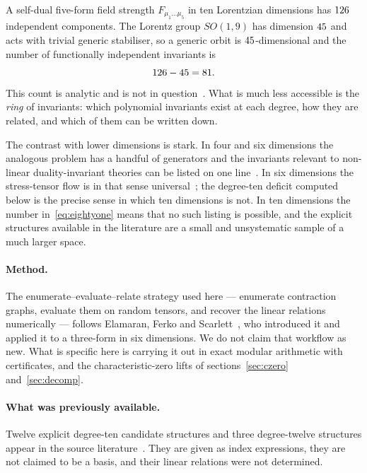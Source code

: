 \documentclass[11pt,a4paper]{article}
\begin{document}
A self-dual five-form field strength $F_{\mu_1\ldots\mu_5}$ in ten Lorentzian
dimensions has $126$ independent components. The Lorentz group
$SO(1,9)$ has dimension $45$ and acts with trivial generic
stabiliser, so a generic orbit is $45$-dimensional and the number
of functionally independent invariants is~\cite{Hutomo:2025chiral}
\begin{equation}
  126 - 45 = 81 .
  \label{eq:eightyone}
\end{equation}
This count is analytic and is not in question~\cite{Hutomo:2025chiral}. What is much less accessible is
the \emph{ring} of invariants: which polynomial invariants exist at each degree,
how they are related, and which of them can be written down.

The contrast with lower dimensions is stark. In four and six dimensions the
analogous problem has a handful of generators and the invariants relevant to
non-linear duality-invariant theories can be listed on one
line~\cite{Bandos:2020hgy,Townsend:2019ftg}. In six dimensions the
stress-tensor flow is in that sense
universal~\cite{Bandos:2024chiral,Brizio:2026ttbar}; the degree-ten deficit
computed below is the precise sense in which ten dimensions is not. In ten
dimensions the number in~\eqref{eq:eightyone} means that no such listing is
possible, and the explicit structures available in the literature are a small
and unsystematic sample of a much larger space.

\paragraph{Method.} The enumerate--evaluate--relate strategy used here ---
enumerate contraction graphs, evaluate them on random tensors, and recover the
linear relations numerically --- follows
Elamaran, Ferko and Scarlett~\cite{Elamaran:2025mlinv}, who introduced it and
applied it to a three-form in six dimensions. We do not claim that workflow as
new. What is specific here is carrying it out in exact modular arithmetic with
certificates, and the characteristic-zero lifts of
sections~\ref{sec:czero} and~\ref{sec:decomp}.

\paragraph{What was previously available.} Twelve explicit degree-ten
candidate structures and three degree-twelve structures appear in the source
literature~\cite{Cederwall:2025invariants}. They are given as index expressions, they are not claimed to be a
basis, and their linear relations were not determined.
\end{document}
